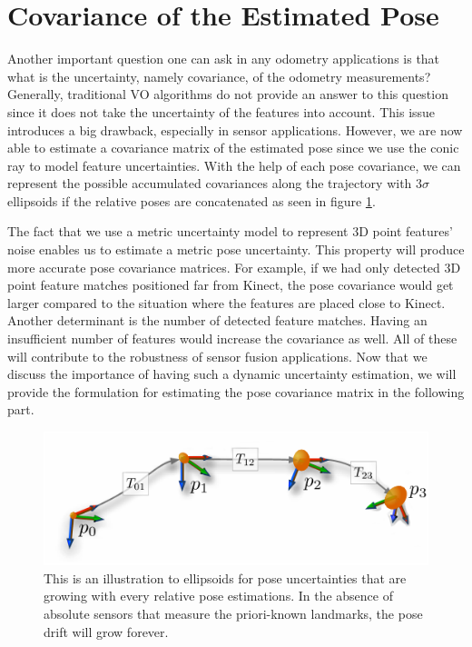\documentclass[a4paper]{report}
\numberwithin{figure}{section}
\begin{document}
\section{Covariance of the Estimated Pose} \label{sc_covariance_estim} 

Another important question one can ask in any odometry applications is that
what is the uncertainty, namely covariance, of the odometry measurements?
Generally, traditional VO algorithms do not provide an answer to this question
since it does not take the uncertainty of the features into account.  This
issue introduces a big drawback, especially in sensor applications.  However,
we are now able to estimate a covariance matrix of the estimated pose since we
use the conic ray to model feature uncertainties.  With the help of each pose
covariance, we can represent the possible accumulated covariances along the
trajectory with $3\sigma$ ellipsoids if the relative poses are concatenated as
seen in figure \ref{fig:pose_uncertainty}. 

The fact that we use a metric uncertainty model to represent 3D point features'
noise enables us to estimate a metric pose uncertainty. This property will
produce more accurate pose covariance matrices.  For example, if we had only
detected 3D point feature matches positioned far from Kinect, the pose
covariance would get larger compared to the situation where the features are
placed close to Kinect.  Another determinant is the number of detected feature
matches. Having an insufficient number of features would increase the
covariance as well.  All of these will contribute to the robustness of sensor
fusion applications.  Now that we discuss the importance of having such a
dynamic uncertainty estimation, we will provide the formulation for estimating
the pose covariance matrix in the following part. 

\begin{figure}[H] \centering
\includegraphics[width=0.7\linewidth,natwidth=640,natheight=640]
{fig/drawings/pose_uncertainty.pdf} \caption[Pose Uncertainty]{This is an
illustration to ellipsoids for pose uncertainties that are growing with every
relative pose estimations. In the absence of absolute sensors that measure the
priori-known landmarks, the pose drift will grow forever.}
\label{fig:pose_uncertainty} \end{figure}
\end{document}
